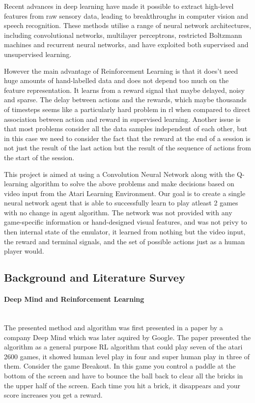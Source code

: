 \documentclass[a4paper,11pt]{article}
\newcommand{\mparagraph}[1]{\paragraph{#1}\mbox{}\\}
\begin{document}
			Recent advances in deep learning have made it possible to extract high-level features from raw sensory data, leading to breakthroughs in computer vision and speech recognition. These methods utilise a range of neural network architectures, including convolutional networks, multilayer perceptrons, restricted Boltzmann machines and recurrent neural networks, and have exploited both supervised and unsupervised learning.
	
			However the main advantage of Reinforcement Learning is that it does't need huge amounts of hand-labelled data and does not depend too much on the feature representation. It learns from a reward signal that maybe delayed, noisy and sparse. The delay between actions and the rewards, which maybe thousands of timesteps seems like a particularly hard problem in \ac{rl} when compared to direct association between action and reward in supervised learning. Another issue is that most problems consider all the data samples independent of each other, but in this case we need to consider the fact that the reward at the end of a session is not just the result of the last action but the result of the sequence of actions from the start of the session.

			This project is aimed at using a Convolution Neural Network along with the Q-learning algorithm to solve the above problems and make decisions based on video input from the Atari Learning Environment. Our goal is to create a single neural network agent that is able to successfully learn to play atleast 2 games with no change in agent algorithm. The network was not provided with any game-specific information or hand-designed visual features, and was not privy to then internal state of the emulator, it learned from nothing but the video input, the reward and terminal signals, and the set of possible actions just as a human player would.

		\subsection{Background and Literature Survey}
			\mparagraph{Deep Mind and Reinforcement Learning}

				The presented method and algorithm was first presented in a paper by a company Deep Mind which was later aquired by Google. The paper presented the algorithm as a general purpose RL algorithm that could play seven of the atari 2600 games, it showed human level play in four and super human play in three of them.
				Consider the game Breakout. In this game you control a paddle at the bottom of the screen and have to bounce the ball back to clear all the bricks in the upper half of the screen. Each time you hit a brick, it disappears and your score increases you get a reward.
\end{document}
